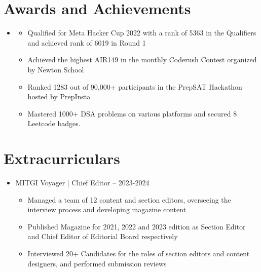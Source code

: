 \documentclass[letterpaper,11pt]{article}
\newcommand{\resumeItem}[1]{
  \item\small{
    {#1 \vspace{-2pt}}
  }
}
\newcommand{\resumeSubHeadingListStart}{\begin{itemize}[leftmargin=0.0in, label={}]}
\newcommand{\resumeSubHeadingListEnd}{\end{itemize}}
\newcommand{\resumeItemListStart}{\begin{itemize}}
\newcommand{\resumeItemListEnd}{\end{itemize}\vspace{-5pt}}
\begin{document}
\section{Awards and Achievements}
    \resumeSubHeadingListStart
    \resumeItem{}
            \vspace{5px}
            \resumeItemListStart
                \resumeItem{Qualified for Meta Hacker Cup 2022 with a rank of 5363 in the Qualifiers and achieved rank of 6019 in Round 1}
                \resumeItem{Achieved the highest AIR149 in the monthly Coderush Contest organized by Newton School}
                \resumeItem{Ranked 1283 out of 90,000+ participants in the PrepSAT Hackathon hosted by PrepInsta}
                \resumeItem{Mastered 1000+ DSA problems on various platforms and secured 8 Leetcode badges.}
               
                
            \resumeItemListEnd
    \resumeSubHeadingListEnd

\section{Extracurriculars}
\resumeSubHeadingListStart
    \resumeItem{MITGI Voyager | Chief Editor -- 2023-2024}
            \vspace{1px}
            \resumeItemListStart
                \resumeItem{Managed a team of 12 content and section editors, overseeing the interview process and developing magazine content}
                \resumeItem{Published Magazine for 2021, 2022 and 2023 edition as Section Editor and Chief Editor of Editorial Board respectively}
                \resumeItem{Interviewed 20+ Candidates for the roles of section editors and content designers, and performed submission reviews}
            \resumeItemListEnd
        
    \resumeSubHeadingListEnd
\end{document}
